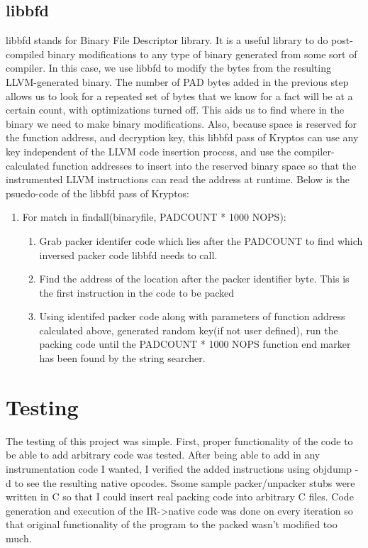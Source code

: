 \documentclass{article}
\begin{document}
\newline

\subsection{libbfd}
libbfd stands for Binary File Descriptor library. It is a useful library to do post-compiled binary modifications to any type of binary generated from some sort of compiler. In this case, we use libbfd to modify the bytes from the resulting LLVM-generated binary. The number of PAD bytes added in the previous step allows us to look for a repeated set of bytes that we know for a fact will be at a certain count, with optimizations turned off. This aids us to find where in the binary we need to make binary modifications. Also, because space is reserved for the function address, and decryption key, this libbfd pass of Kryptos can use any key independent of the LLVM code insertion process, and use the compiler-calculated function addresses to insert into the reserved binary space so that the instrumented LLVM instructions can read the address at runtime. Below is the psuedo-code of the libbfd pass of Kryptos:
\begin{enumerate}
\item For match in findall(binaryfile, PADCOUNT * 1000 NOPS):
\begin{enumerate}
\item Grab packer identifer code which lies after the PADCOUNT to find which inversed packer code libbfd needs to call.
\item Find the address of the location after the packer identifier byte. This is the first instruction in the code to be packed
\item Using identifed packer code along with parameters of function address calculated above, generated random key(if not user defined), run the packing code until the PADCOUNT * 1000 NOPS function end marker has been found by the string searcher.
\end{enumerate}
\end{enumerate}

\newpage

\section{Testing}
The testing of this project was simple. First, proper functionality of the code to be able to add arbitrary code was tested. After being able to add in any instrumentation code I wanted, I verified the added instructions using objdump -d to see the resulting native opcodes. Ssome sample packer/unpacker stubs were written in C so that I could insert real packing code into arbitrary C files. Code generation and execution of the IR->native code was done on every iteration so that original functionality of the program to the packed wasn't modified too much.
\end{document}

